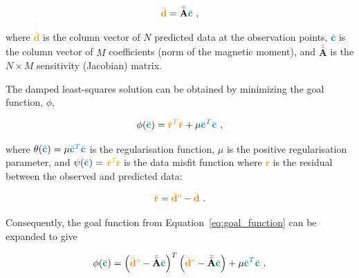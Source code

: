\begin{equation}
    \textcolor{orange}{\bar{\mathbf{d}}} = \bar{\bar{\mathbf{A}}} \textcolor{teal}{\bar{\mathbf{c}}}
    \ ,
\end{equation}

\noindent
where \textcolor{orange}{$\bar{\mathbf{d}}$} is the column vector of $N$ predicted data at the observation points, \textcolor{teal}{$\bar{\mathbf{c}}$} is the column vector of $M$ coefficients (norm of the magnetic moment), and $\bar{\bar{\mathbf{A}}}$ is the $N \times M$ sensitivity (Jacobian) matrix. 


The damped least-squares solution can be obtained by minimizing the goal function, $\phi$, 

\begin{equation}
\label{eq:goal_function}
    \phi(\textcolor{teal}{\bar{\mathbf{c}}}) = \textcolor{orange}{\bar{\mathbf{r}}^T\bar{\mathbf{r}}} + \mu \textcolor{teal}{\bar{\mathbf{c}}^T\bar{\mathbf{c}}}
    \ ,
\end{equation}

\noindent
where $\theta(\textcolor{teal}{\bar{\mathbf{c}}}) = \mu \textcolor{teal}{\bar{\mathbf{c}}^T\bar{\mathbf{c}}}$ is the regularisation function, $\mu$ is the positive regularisation parameter, and $\psi(\textcolor{teal}{\bar{\mathbf{c}}}) =$ \textcolor{orange}{$\bar{\mathbf{r}}^T\bar{\mathbf{r}}$} is the data misfit function where \textcolor{orange}{$\bar{\mathbf{r}}$} is the residual between the observed and predicted data:

\begin{equation}
    \label{eqs:resdiual}
    \textcolor{orange}{\bar{\mathbf{r}}} = \textcolor{orange}{\bar{\mathbf{d}}^o} - \textcolor{orange}{\bar{\mathbf{d}}}
    \ .
\end{equation}

\noindent
Consequently, the goal function from Equation~\ref{eq:goal_function} can  be expanded to give

\begin{equation}
    \phi (\textcolor{teal}{\bar{\mathbf{c}}}) = \left(\textcolor{orange}{\bar{\mathbf{d}}^o} - \Bar{\Bar{\mathbf{A}}} \textcolor{teal}{\bar{\mathbf{c}}}\right)^T \left(\textcolor{orange}{\bar{\mathbf{d}}^o} - \Bar{\Bar{\mathbf{A}}} \textcolor{teal}{\bar{\mathbf{c}}}\right) + \mu \textcolor{teal}{\bar{\mathbf{c}}^T\bar{\mathbf{c}}}
    \ .
\end{equation}

